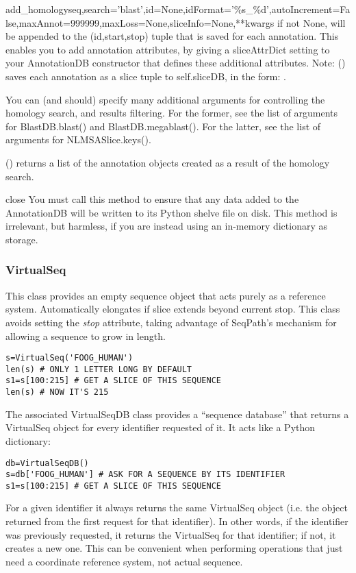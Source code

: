 \documentclass{howto}
\begin{document}
\begin{funcdesc}{add_homology}{seq,search='blast',id=None,idFormat='\%s_\%d',autoIncrement=False,maxAnnot=999999,maxLoss=None,sliceInfo=None,**kwargs}
   if not None, will be appended to the (id,start,stop)
  tuple that is saved for each annotation.  This enables you to add
  annotation attributes, by giving a sliceAttrDict setting to your AnnotationDB
  constructor that defines these additional attributes.  Note: ()
  saves each annotation as a slice tuple to self.sliceDB, in the form:
  .

  You can (and should) specify many additional arguments for controlling
  the homology search, and results filtering.  For the former, see the list
  of arguments for BlastDB.blast() and BlastDB.megablast().  For the latter,
  see the list of arguments for NLMSASlice.keys().

  () returns a list of the annotation objects 
  created as a result of the homology search.
\end{funcdesc}

\begin{funcdesc}{close}{}
  You must call this method to ensure that any data added to the AnnotationDB
  will be written to its Python shelve file on disk.
  This method is irrelevant, but harmless,
  if you are instead using an in-memory dictionary as storage.
\end{funcdesc}

\subsubsection{VirtualSeq}
This class provides an empty sequence object that
acts purely as a reference system.
Automatically elongates if slice extends beyond current stop.
This class avoids setting the {\em stop} attribute, taking advantage
of SeqPath's mechanism for allowing a sequence to grow in length.
\begin{verbatim}
s=VirtualSeq('FOOG_HUMAN')
len(s) # ONLY 1 LETTER LONG BY DEFAULT
s1=s[100:215] # GET A SLICE OF THIS SEQUENCE
len(s) # NOW IT'S 215
\end{verbatim}

The associated VirtualSeqDB class provides a ``sequence database''
that returns a VirtualSeq object for every identifier requested of
it.  It acts like a Python dictionary:
\begin{verbatim}
db=VirtualSeqDB()
s=db['FOOG_HUMAN'] # ASK FOR A SEQUENCE BY ITS IDENTIFIER
s1=s[100:215] # GET A SLICE OF THIS SEQUENCE
\end{verbatim}
For a given identifier it always returns the same VirtualSeq
object (i.e. the object returned from the first request for that identifier).
In other words, if the identifier was previously requested,
it returns the VirtualSeq for that identifier; if not, it 
creates a new one.
This can be convenient when performing operations that just
need a coordinate reference system, not actual sequence.
\end{document}
